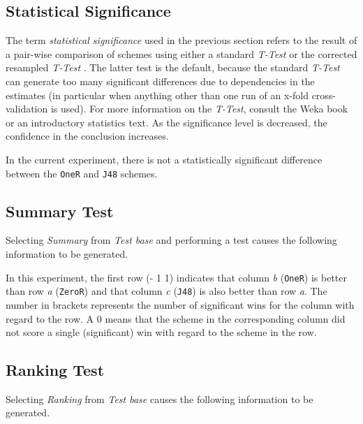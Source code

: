 \documentclass[a4paper]{article}
\begin{document}
\subsection{Statistical Significance}

The term \textit{statistical significance} used in the previous section refers to the result of a pair-wise comparison of schemes using either a standard \textit{T-Test} or the corrected resampled \textit{T-Test} \cite{bengio}. The latter test is the default, because the standard \textit{T-Test} can generate too many significant differences due to dependencies in the estimates (in particular when anything other than one run of an x-fold cross-validation is used). For more information on the \textit{T-Test}, consult the Weka book \cite{witten} or an introductory statistics text. As the significance level is decreased, the confidence in the conclusion increases.

In the current experiment, there is not a statistically significant difference between the \texttt{OneR} and \texttt{J48} schemes.


\subsection{Summary Test}

Selecting \textit{Summary} from \textit{Test base} and performing a test causes the following information to be generated.
\begin{center}
\end{center}

In this experiment, the first row (- 1 1) indicates that column \textit{b} (\texttt{OneR}) is better than row \textit{a} (\texttt{ZeroR}) and that column \textit{c} (\texttt{J48}) is also better than row \textit{a}. The number in brackets represents the number of significant wins for the column with regard to the row. A $0$ means that the scheme in the corresponding column did not score a single (significant) win with regard to the scheme in the row.


\subsection{Ranking Test}

Selecting \textit{Ranking} from \textit{Test base} causes the following information to be generated.
\begin{center}
\end{center}
\end{document}
